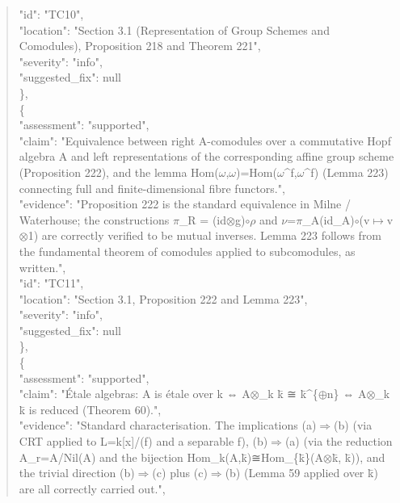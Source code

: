 \documentclass[11pt]{article}
\begin{document}
\begin{quote}
      "id": "TC10",\\
      "location": "Section 3.1 (Representation of Group Schemes and Comodules), Proposition 218 and Theorem 221",\\
      "severity": "info",\\
      "suggested\_fix": null\\
    \},\\
    \{\\
      "assessment": "supported",\\
      "claim": "Equivalence between right A-comodules over a commutative Hopf algebra A and left representations of the corresponding affine group scheme (Proposition 222), and the lemma Hom(\ensuremath{\omega},\ensuremath{\omega})=Hom(\ensuremath{\omega}\^{}f,\ensuremath{\omega}\^{}f) (Lemma 223) connecting full and finite-dimensional fibre functors.",\\
      "evidence": "Proposition 222 is the standard equivalence in Milne / Waterhouse; the constructions \ensuremath{\pi}\_R = (id\ensuremath{\otimes}g)\ensuremath{\circ}\ensuremath{\rho} and \ensuremath{\nu}=\ensuremath{\pi}\_A(id\_A)\ensuremath{\circ}(v\ensuremath{\mapsto}v\ensuremath{\otimes}1) are correctly verified to be mutual inverses. Lemma 223 follows from the fundamental theorem of comodules applied to subcomodules, as written.",\\
      "id": "TC11",\\
      "location": "Section 3.1, Proposition 222 and Lemma 223",\\
      "severity": "info",\\
      "suggested\_fix": null\\
    \},\\
    \{\\
      "assessment": "supported",\\
      "claim": "Étale algebras: A is étale over k ⇔ A\ensuremath{\otimes}\_k k\={} ≅ k\={}\^{}\{\ensuremath{\oplus}n\} ⇔ A\ensuremath{\otimes}\_k k\={} is reduced (Theorem 60).",\\
      "evidence": "Standard characterisation. The implications (a)\ensuremath{\Rightarrow}(b) (via CRT applied to L=k[x]/(f) and a separable f), (b)\ensuremath{\Rightarrow}(a) (via the reduction A\_r=A/Nil(A) and the bijection Hom\_k(A,k\={})≅Hom\_\{k\={}\}(A\ensuremath{\otimes}k\={}, k\={})), and the trivial direction (b)\ensuremath{\Rightarrow}(c) plus (c)\ensuremath{\Rightarrow}(b) (Lemma 59 applied over k\={}) are all correctly carried out.",\\

\end{quote}
\end{document}
